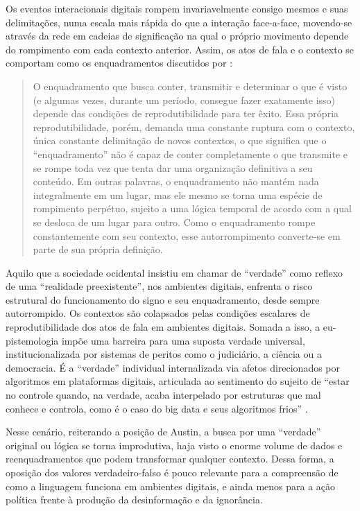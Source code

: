 \documentclass[portuguese]{textolivre}
\begin{document}
Os eventos interacionais digitais rompem invariavelmente consigo mesmos e suas delimitações, numa escala mais rápida do que a interação face-a-face, movendo-se através da rede em cadeias de significação na qual o próprio movimento depende do rompimento com cada contexto anterior. Assim, os atos de fala e o contexto se comportam como os enquadramentos discutidos por \textcite[p. 26]{butler2015quadros}:

\begin{quote}
    O enquadramento que busca conter, transmitir e determinar o que é visto (e algumas vezes, durante um período, consegue fazer exatamente isso) depende das condições de reprodutibilidade para ter êxito. Essa própria reprodutibilidade, porém, demanda uma constante ruptura com o contexto, única constante delimitação de novos contextos, o que significa que o “enquadramento” não é capaz de conter completamente o que transmite e se rompe toda vez que tenta dar uma organização definitiva a seu conteúdo. Em outras palavras, o enquadramento não mantém nada integralmente em um lugar, mas ele mesmo se torna uma espécie de rompimento perpétuo, sujeito a uma lógica temporal de acordo com a qual se desloca de um lugar para outro. Como o enquadramento rompe constantemente com seu contexto, esse autorrompimento converte-se em parte de sua própria definição.
\end{quote}

Aquilo que a sociedade ocidental insistiu em chamar de “verdade” como reflexo de uma “realidade preexistente”, nos ambientes digitais, enfrenta o risco estrutural do funcionamento do signo e seu enquadramento, desde sempre autorrompido. Os contextos são colapsados pelas condições escalares de reprodutibilidade dos atos de fala em ambientes digitais. Somada a isso, a eu-pistemologia impõe uma barreira para uma suposta verdade universal, institucionalizada por sistemas de peritos como o judiciário, a ciência ou a democracia. É a “verdade” individual internalizada via afetos direcionados por algoritmos em plataformas digitais, articulada ao sentimento do sujeito de “estar no controle quando, na verdade, acaba interpelado por estruturas que mal conhece e controla, como é o caso do big data e seus algoritmos frios” \cite[p. 156]{faustino2023colonialismo}.

Nesse cenário, reiterando a posição de Austin, a busca por uma “verdade” original ou lógica se torna improdutiva, haja visto o enorme volume de dados e reenquadramentos que podem transformar qualquer contexto. Dessa forma, a oposição dos valores verdadeiro-falso é pouco relevante para a compreensão de como a linguagem funciona em ambientes digitais, e ainda menos para a ação política frente à produção da desinformação e da ignorância.
\end{document}
